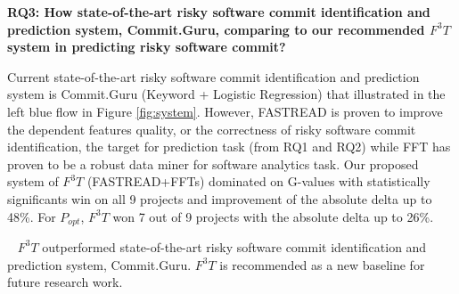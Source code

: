 \documentclass[sigconf,review, anonymous]{acmart}
\newenvironment{RQ}[1]%
{\noindent\begin{minipage}[c]{\linewidth}%
\begin{bclogo}[couleur=gray!25,%
                arrondi=0.1,%
                logo=\bctrombone,%
                ombre=true]{~#1}}%
{\end{bclogo}\end{minipage}\vspace{2mm}}
\begin{document}
\textbf{RQ3: {How state-of-the-art risky software commit identification and prediction system, Commit.Guru, comparing to our recommended $F^3T$ system in predicting risky software commit?}}
 

Current state-of-the-art risky software commit identification and prediction system is Commit.Guru (Keyword + Logistic Regression) that illustrated in the left blue flow in Figure \ref{fig:system}. However, FASTREAD is proven to improve the dependent features quality, or the correctness of risky software commit identification, the target for prediction task (from RQ1 and RQ2) while FFT has proven to be a robust data miner for software analytics task. Our proposed system of $F^3T$ (FASTREAD+FFTs) dominated on G-values with statistically significants win on all 9 projects and improvement  of the absolute delta up to 48\%. For $P_{opt}$,  $F^3T$ won 7 out of 9 projects with the absolute delta up to 26\%. 

  
\begin{RQ}{}
\vspace{-10pt}
$F^3T$ outperformed state-of-the-art risky software commit identification and prediction system, Commit.Guru. $F^3T$ is recommended as a new baseline for future research work.
\end{RQ}

 
\end{document}
